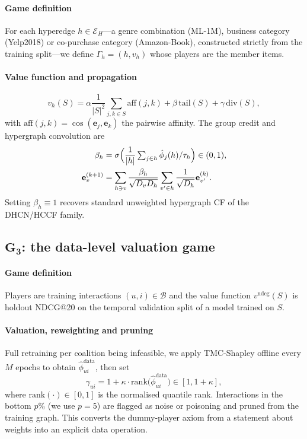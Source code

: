 \documentclass[final,5p,times,twocolumn]{elsarticle}
\begin{document}
\paragraph{Game definition}
For each hyperedge $h \in \mathcal{E}_H$---a genre combination (ML-1M),
business category (Yelp2018) or co-purchase category (Amazon-Book),
constructed strictly from the training split---we define $\Gamma_h = (h, v_h)$
whose players are the member items.

\paragraph{Value function and propagation}
\begin{equation}
v_h(S) = \alpha \frac{1}{|S|^2} \!\!\sum_{j,k \in S}\!\! \mathrm{aff}(j,k)
+ \beta\, \mathrm{tail}(S) + \gamma\, \mathrm{div}(S),
\end{equation}
with $\mathrm{aff}(j,k) = \cos(\mathbf{e}_j,\mathbf{e}_k)$ the pairwise
affinity. The group credit and hypergraph convolution are
\begin{align}
\beta_h &= \sigma \Bigl( \frac{1}{|h|} \textstyle\sum_{j \in h}
\hat{\phi}_j(h)/\tau_h \Bigr) \in (0,1), \\
\mathbf{e}_v^{(k+1)} &= \sum_{h \ni v} \frac{\beta_h}{\sqrt{D_v D_h}}
\sum_{v' \in h} \frac{1}{\sqrt{D_h}} \mathbf{e}_{v'}^{(k)} .
\end{align}
Setting $\beta_h \equiv 1$ recovers standard unweighted hypergraph CF of the
DHCN/HCCF family.

\subsection{$\mathbf{G_3}$: the data-level valuation game}
\label{sec:g3}

\paragraph{Game definition}
Players are training interactions $(u,i) \in \mathcal{B}$ and the value
function $v^{\mathrm{ndcg}}(S)$ is holdout NDCG@20 on the temporal validation
split of a model trained on $S$.

\paragraph{Valuation, reweighting and pruning}
Full retraining per coalition being infeasible, we apply TMC-Shapley
\citep{ghorbani2019datashapley} offline every $M$ epochs to obtain
$\hat{\phi}^{\mathrm{data}}_{ui}$, then set
\begin{equation}
\gamma_{ui} = 1 + \kappa \cdot
\mathrm{rank}\bigl(\hat{\phi}^{\mathrm{data}}_{ui}\bigr) \in [1, 1+\kappa],
\end{equation}
where $\mathrm{rank}(\cdot) \in [0,1]$ is the normalised quantile rank.
Interactions in the bottom $p\%$ (we use $p = 5$) are flagged as
noise or poisoning and pruned from the training graph. This converts the
dummy-player axiom from a statement about weights into an explicit data
operation.
\end{document}
